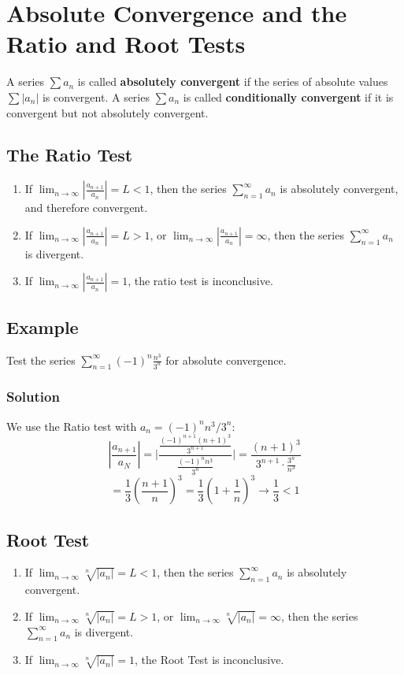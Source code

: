 \section{Absolute Convergence and the Ratio and Root Tests}
A series $\textstyle\sum a_n$ is called \textbf{absolutely convergent} if the series of absolute values $\textstyle\sum |a_n|$ is convergent. 
A series $\textstyle\sum a_n$ is called \textbf{conditionally convergent} if it is convergent but not absolutely convergent.
\subsection*{The Ratio Test}
\begin{enumerate}
    \item If $\lim_{n\rightarrow\infty}|\frac{a_{n+1}}{a_n}| = L < 1$, then the series $\sum^\infty_{n = 1}a_n$ is absolutely convergent, and therefore convergent.
    \item If $\lim_{n\rightarrow\infty}|\frac{a_{n+1}}{a_n}| = L > 1$, or $\lim_{n\rightarrow\infty}|\frac{a_{n+1}}{a_n}| = \infty$, then the series $\sum^\infty_{n = 1}a_n$ is divergent.
    \item If $\lim_{n\rightarrow\infty}|\frac{a_{n+1}}{a_n}| = 1$, the ratio test is inconclusive.
\end{enumerate}
\subsection*{Example}
Test the series $\sum^\infty_{n = 1} (-1)^n\frac{n^3}{3^n}$ for absolute convergence.
\subsubsection*{Solution}
We use the Ratio test with $a_n = (-1)^n n^3/3^n$: 
$$|\frac{a_{n+1}}{a_N}| = \lvert\frac{\frac{(-1)^{n + 1}(n + 1)^3}{3^{n + 1}}}{\frac{(-1)^nn^3}{3^n}}\rvert = \frac{(n+1)^3}{3^{n + 1}\cdot\frac{3^n}{n^3}}$$
$$= \frac{1}{3}(\frac{n + 1}{n})^3 = \frac{1}{3}(1 + \frac{1}{n})^3\rightarrow \frac{1}{3} < 1$$

\subsection*{Root Test}
\begin{enumerate}
    \item If $\lim_{n\rightarrow\infty}\sqrt[n]{|a_n|} = L < 1$, then the series $\sum^\infty_{n = 1}a_n$ is absolutely convergent.
    \item If $\lim_{n\rightarrow\infty}\sqrt[n]{|a_n|} = L > 1$, or $\lim_{n\rightarrow\infty}\sqrt[n]{|a_n|} = \infty$, then the series $\sum^\infty_{n = 1}a_n$ is divergent.
    \item If $\lim_{n\rightarrow\infty}\sqrt[n]{|a_n|} = 1$, the Root Test is inconclusive.
\end{enumerate}

